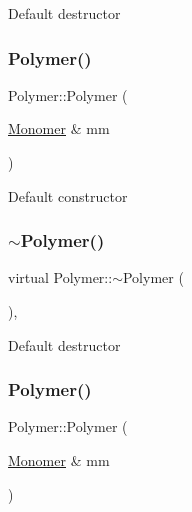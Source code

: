 Default destructor \mbox{\label{classPolymer_ae77454a3908652e4df6a26b9cac509a5}} 
\subsubsection{\texorpdfstring{Polymer()}{Polymer()}\hspace{0.1cm}{\footnotesize\ttfamily [7/14]}}
{\footnotesize\ttfamily Polymer\+::\+Polymer (\begin{DoxyParamCaption}\item[{\mbox{\hyperlink{classMonomer}{Monomer}} \&}]{mm }\end{DoxyParamCaption})\hspace{0.3cm}{\ttfamily [inline]}}

Default constructor \mbox{\label{classPolymer_aac2b3983f375a5691c7d5ca1a79594d5}} 
\subsubsection{\texorpdfstring{$\sim$\+Polymer()}{~Polymer()}\hspace{0.1cm}{\footnotesize\ttfamily [7/11]}}
{\footnotesize\ttfamily virtual Polymer\+::$\sim$\+Polymer (\begin{DoxyParamCaption}{ }\end{DoxyParamCaption})\hspace{0.3cm}{\ttfamily [inline]}, {\ttfamily [virtual]}}

Default destructor \mbox{\label{classPolymer_ae77454a3908652e4df6a26b9cac509a5}} 
\subsubsection{\texorpdfstring{Polymer()}{Polymer()}\hspace{0.1cm}{\footnotesize\ttfamily [8/14]}}
{\footnotesize\ttfamily Polymer\+::\+Polymer (\begin{DoxyParamCaption}\item[{\mbox{\hyperlink{classMonomer}{Monomer}} \&}]{mm }\end{DoxyParamCaption})\hspace{0.3cm}{\ttfamily [inline]}}

